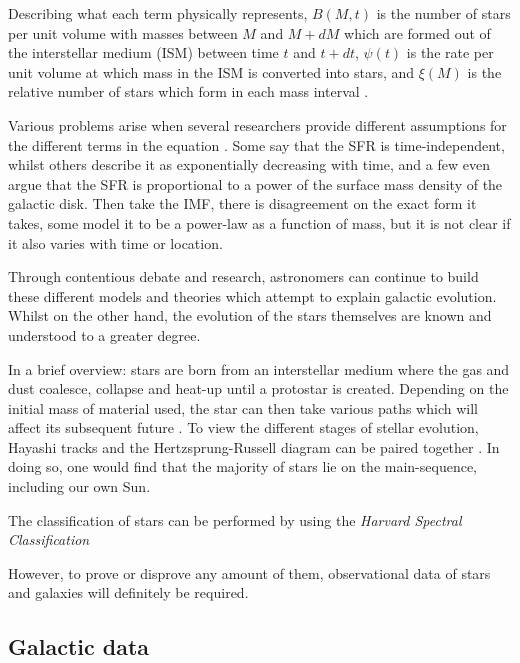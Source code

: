 \documentclass[12pt, twocolumn]{revtex4}    %
\begin{document}
Describing what each term physically represents, $B(M,t)$ is the number of stars per unit volume with masses between $M$ and $M+dM$ which are formed out of the interstellar medium (ISM) between time $t$ and $t+dt$, $\psi(t)$ is the rate per unit volume at which mass in the ISM is converted into stars, and $\xi(M)$ is the relative number of stars which form in each mass interval \cite{carroll_astro}. 

Various problems arise when several researchers provide different assumptions for the different terms in the equation \cite{carroll_astro}. Some say that the SFR is time-independent, whilst others describe it as exponentially decreasing with time, and a few even argue that the SFR is proportional to a power of the surface mass density of the galactic disk. Then take the IMF, there is disagreement on the exact form it takes, some model it to be a power-law as a function of mass, but it is not clear if it also varies with time or location.

Through contentious debate and research, astronomers can continue to build these different models and theories which attempt to explain galactic evolution. Whilst on the other hand, the evolution of the stars themselves are known and understood to a greater degree. 

In a brief overview: stars are born from an interstellar medium where the gas and dust coalesce, collapse and heat-up until a protostar is created. Depending on the initial mass of material used, the star can then take various paths which will affect its subsequent future \cite{mccoy_stars}. To view the different stages of stellar evolution, Hayashi tracks and the Hertzsprung-Russell diagram can be paired together \cite{carroll_astro}. In doing so, one would find that the majority of stars lie on the main-sequence, including our own Sun. 

The classification of stars can be performed by using the \textit{Harvard Spectral Classification}

However, to prove or disprove any amount of them, observational data of stars and galaxies will definitely be required. 



\subsection{Galactic data} 
\end{document}
